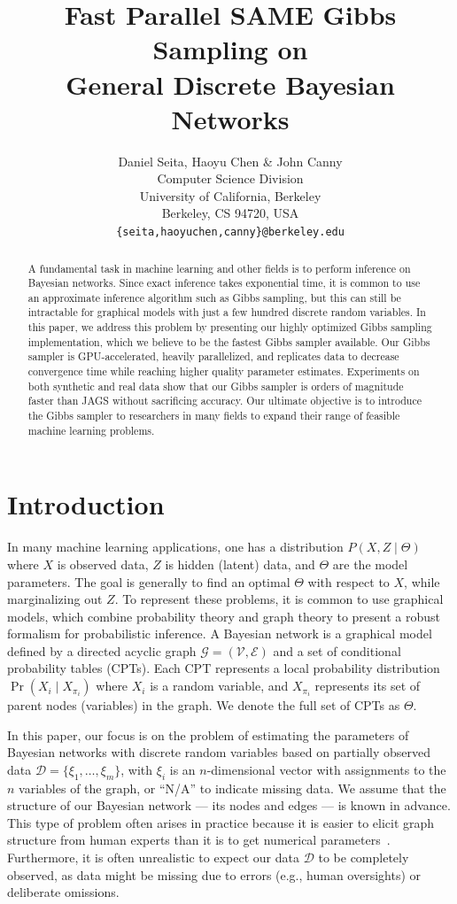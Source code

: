 \documentclass{article} %
\title{Fast Parallel SAME Gibbs Sampling on \\ General Discrete Bayesian Networks}
\author{Daniel Seita, Haoyu Chen \& John Canny \\
Computer Science Division \\
University of California, Berkeley \\
Berkeley, CS 94720, USA \\
\texttt{\{seita,haoyuchen,canny\}@berkeley.edu}
}
\begin{document}
\maketitle

\begin{abstract}
A fundamental task in machine learning and other fields is to perform inference on Bayesian
networks. Since exact inference takes exponential time, it is common to use an approximate inference
algorithm such as Gibbs sampling, but this can still be intractable for graphical models with just a
few hundred discrete random variables. In this paper, we address this problem by presenting our
highly optimized Gibbs sampling implementation, which we believe to be the fastest Gibbs sampler
available. Our Gibbs sampler is GPU-accelerated, heavily parallelized, and replicates data to
decrease convergence time while reaching higher quality parameter estimates. Experiments on both
synthetic and real data show that our Gibbs sampler is orders of magnitude faster than JAGS without
sacrificing accuracy. Our ultimate objective is to introduce the Gibbs sampler to researchers in
many fields to expand their range of feasible machine learning problems.
\end{abstract}




\section{Introduction}\label{sec:intro}

In many machine learning applications, one has a distribution $P(X,Z \mid \Theta)$ where $X$ is
observed data, $Z$ is hidden (latent) data, and $\Theta$ are the model parameters. The goal is
generally to find an optimal $\Theta$ with respect to $X$, while marginalizing out $Z$. To represent
these problems, it is common to use graphical models, which combine probability theory and graph
theory to present a robust formalism for probabilistic inference. A Bayesian network is a graphical
model defined by a directed acyclic graph $\mathcal{G} = (\mathcal{V}, \mathcal{E})$ and a set of
conditional probability tables (CPTs). Each CPT represents a local probability distribution $\Pr(X_i
\mid X_{\pi_i})$ where $X_i$ is a random variable, and $X_{\pi_i}$ represents its set of parent
nodes (variables) in the graph. We denote the full set of CPTs as $\Theta$.

In this paper, our focus is on the problem of estimating the parameters of Bayesian networks with
discrete random variables based on partially observed data $\mathcal{D} = \{\xi_1, \ldots, \xi_m\}$,
with $\xi_i$ is an $n$-dimensional vector with assignments to the $n$ variables of the graph, or
``N/A'' to indicate missing data. We assume that the structure of our Bayesian network --- its nodes
and edges --- is known in advance. This type of problem often arises in practice because it is
easier to elicit graph structure from human experts than it is to get numerical
parameters~\citep{koller2009}. Furthermore, it is often unrealistic to expect our data $\mathcal{D}$
to be completely observed, as data might be missing due to errors (e.g., human oversights) or
deliberate omissions.
\end{document}
